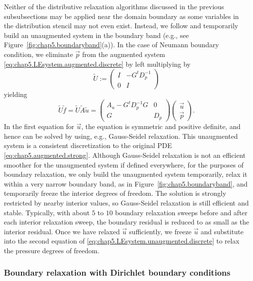 Neither of the distributive relaxation algorithms discussed in the previous subsubsections may be applied near the domain boundary as some variables in the distribution stencil may not even exist. Instead, we follow \cite{Zhu.Yongning10} and temporarily build an unaugmented system in the boundary band (e.g., see Figure~\ref{fig:chap5.boundaryband}(a)). In the case of Neumann boundary condition, we eliminate $\vec{p}$ from the augmented system \eqref{eq:chap5.LEsystem.augmented.discrete} by left multiplying by
\begin{equation*}
\tilde{U} := \begin{pmatrix} I & -G^t D_p^{-1} \\ 0 & I \end{pmatrix}
\end{equation*}
yielding
\begin{equation} \label{eq:chap5.LEsystem.unaugmented.discrete}
\tilde{U} \tilde{f} = \tilde{U} \tilde{A} \tilde{u} =
\begin{pmatrix} A_u - G^t D_p^{-1} G & 0 \\ G & D_p \end{pmatrix}
\begin{pmatrix} \vec{u} \\ \vec{p} \end{pmatrix}.
\end{equation}
In the first equation for $\vec{u}$, the equation is symmetric and positive definite, and hence can be solved by using, e.g., Gauss-Seidel relaxation. This unaugmented system is a consistent discretization to the original PDE \eqref{eq:chap5.augmented.strong}. Although Gauss-Seidel relaxation is not an efficient smoother for the unaugmented system if defined everywhere, for the purposes of boundary relaxation, we only build the unaugmented system temporarily, relax it within a very narrow boundary band, as in Figure~\ref{fig:chap5.boundaryband}, and temporarily freeze the interior degrees of freedom. The solution is strongly restricted by nearby interior values, so Gauss-Seidel relaxation is still efficient and stable. Typically, with about $5$ to $10$ boundary relaxation sweeps before and after each interior relaxation sweep, the boundary residual is reduced to as small as the interior residual. Once we have relaxed $\vec{u}$ sufficiently, we freeze $\vec{u}$ and substitute into the second equation of \eqref{eq:chap5.LEsystem.unaugmented.discrete} to relax the pressure degrees of freedom.

\subsubsection{Boundary relaxation with Dirichlet boundary conditions}

